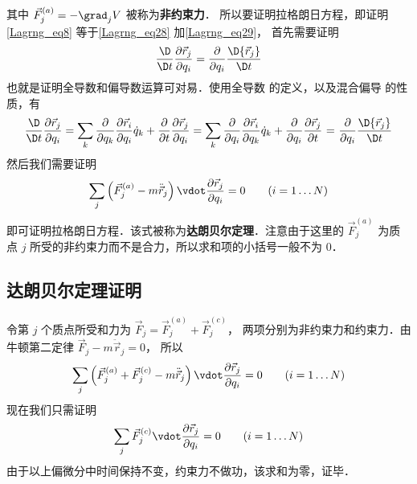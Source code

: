 其中 ${\vec F}_j^{(a)} = - {\grad_j}V$ 被称为\textbf{非约束力}．%
所以要证明拉格朗日方程，即证明\autoref{Lagrng_eq8} 等于\autoref{Lagrng_eq28} 加\autoref{Lagrng_eq29}， 首先需要证明
\begin{equation}
\frac{\D}{{\D t}}\frac{{\partial {{\vec r}_j}}}{{\partial {q_i}}} = \frac{\partial }{{\partial {q_i}}}\frac{{\D{{\vec r}_j}}}{{\D t}}
\end{equation}
也就是证明全导数和偏导数运算可对易．使用全导数 的定义，以及混合偏导 的性质，有
\begin{equation}
\frac{\D}{{\D t}}\frac{{\partial {{\vec r}_j}}}{{\partial {q_i}}} = \sum\limits_k {\frac{\partial }{{\partial {q_k}}}\frac{{\partial {{\vec r}_i}}}{{\partial {q_i}}}{{\dot q}_k}}  + \frac{\partial }{{\partial t}}\frac{{\partial {{\vec r}_j}}}{{\partial {q_i}}} = \sum\limits_k {\frac{\partial }{{\partial {q_i}}}\frac{{\partial {{\vec r}_i}}}{{\partial {q_k}}}{{\dot q}_k}}  + \frac{\partial }{{\partial {q_i}}}\frac{{\partial {{\vec r}_j}}}{{\partial t}}{\text{ = }}\frac{\partial }{{\partial {q_i}}}\frac{{\D{{\vec r}_j}}}{{\D t}}
\end{equation}
然后我们需要证明
\begin{equation}
\sum\limits_j {\left( {\vec F_j^{(a)} - m\ddot{\vec r}_j} \right) \vdot \frac{{\partial {{\vec r}_j}}}{{\partial {q_i}}}}  = 0
\qquad (i = 1\dots N)
\end{equation}
即可证明拉格朗日方程．该式被称为\textbf{达朗贝尔定理}．注意由于这里的 $\vec F_j^{(a)}$ 为质点 $j$ 所受的非约束力而不是合力，所以求和项的小括号一般不为 0．

\subsection{达朗贝尔定理证明}
令第 $j$ 个质点所受和力为 $\vec F_j = \vec F_j^{(a)} + \vec F_j^{(c)}$， 两项分别为非约束力和约束力．由牛顿第二定律 $\vec F_j - m\ddot{\vec r}_j = 0$， 所以
\begin{equation}
\sum\limits_j {\left( {\vec F_j^{(a)}+\vec F_j^{(c)} - m\ddot{\vec r}_j} \right) \vdot \frac{{\partial {{\vec r}_j}}}{{\partial {q_i}}}}  = 0
\qquad (i = 1\dots N)
\end{equation}
现在我们只需证明
\begin{equation}
\sum\limits_j { {\vec F_j^{(c)}} \vdot \frac{{\partial {{\vec r}_j}}}{{\partial {q_i}}}}  = 0
\qquad (i = 1\dots N)
\end{equation}
由于以上偏微分中时间保持不变，约束力不做功，该求和为零，证毕．%


